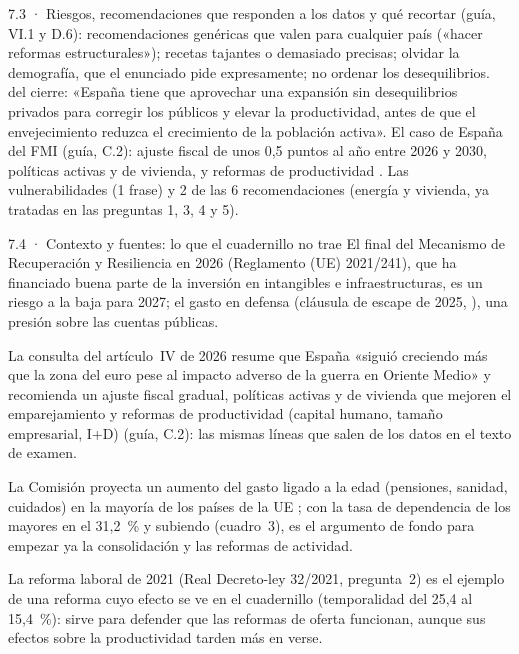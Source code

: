 \begin{complemento}{7.3 · Riesgos, recomendaciones que responden a los datos y qué recortar}
 (guía, VI.1 y D.6): recomendaciones genéricas que valen para cualquier país («hacer reformas estructurales»); recetas tajantes o demasiado precisas; olvidar la demografía, que el enunciado pide expresamente; no ordenar los desequilibrios.  del cierre: «España tiene que aprovechar una expansión sin desequilibrios privados para corregir los públicos y elevar la productividad, antes de que el envejecimiento reduzca el crecimiento de la población activa».  El caso de España del FMI (guía, C.2): ajuste fiscal de unos 0,5 puntos al año entre 2026 y 2030, políticas activas y de vivienda, y reformas de productividad \parencite{FMI2026ArticuloIV}.  Las vulnerabilidades (1 frase) y 2 de las 6 recomendaciones (energía y vivienda, ya tratadas en las preguntas 1, 3, 4 y 5).
\end{complemento}

\begin{complemento}{7.4 · Contexto y fuentes: lo que el cuadernillo no trae}
 El final del Mecanismo de Recuperación y Resiliencia en 2026 (Reglamento (UE) 2021/241), que ha financiado buena parte de la inversión en intangibles e infraestructuras, es un riesgo a la baja para 2027; el gasto en defensa (cláusula de escape de 2025, \cite{CE2025Defensa}), una presión sobre las cuentas públicas.

 La consulta del artículo~IV de 2026 resume que España «siguió creciendo más que la zona del euro pese al impacto adverso de la guerra en Oriente Medio» y recomienda un ajuste fiscal gradual, políticas activas y de vivienda que mejoren el emparejamiento y reformas de productividad (capital humano, tamaño empresarial, I+D) \parencite{FMI2026ArticuloIV} (guía, C.2): las mismas líneas que salen de los datos en el texto de examen.

 La Comisión proyecta un aumento del gasto ligado a la edad (pensiones, sanidad, cuidados) en la mayoría de los países de la UE \parencite{CE2024Envejecimiento}; con la tasa de dependencia de los mayores en el 31,2~\% y subiendo (cuadro~3), es el argumento de fondo para empezar ya la consolidación y las reformas de actividad.

 La reforma laboral de 2021 (Real Decreto-ley 32/2021, pregunta~2) es el ejemplo de una reforma cuyo efecto se ve en el cuadernillo (temporalidad del 25,4 al 15,4~\%): sirve para defender que las reformas de oferta funcionan, aunque sus efectos sobre la productividad tarden más en verse.
\end{complemento}

